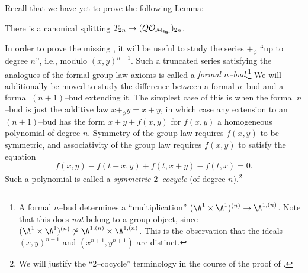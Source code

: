 Recall that we have yet to prove the following Lemma:

\begin{lemma}\label{LazardSplittingLemma}
There is a canonical splitting $T_{2n} \to (Q \mathcal O_{\mathcal{M}_{\mathbf{fgl}}})_{2n}$.
\end{lemma}

\begin{definition}\label{DefinitionSymmetric2Cocycle}
In order to prove the missing , it will be useful to study the series $+_\phi$ ``up to degree $n$'', i.e., modulo $(x, y)^{n+1}$.  Such a truncated series satisfying the analogues of the formal group law axioms is called a \textit{formal $n$--bud}.\footnote{A formal $n$--bud determines a ``multiplication'' $(\A^1 \times \A^1)^{(n)} \to \A^{1,(n)}$.  Note that this does \emph{not} belong to a group object, since $(\A^1 \times \A^1)^{(n)} \not\simeq \A^{1,(n)} \times \A^{1,(n)}$.  This is the observation that the ideals $(x, y)^{n+1}$ and $(x^{n+1}, y^{n+1})$ are distinct.}  We will additionally be moved to study the difference between a formal $n$--bud and a formal $(n+1)$--bud extending it.  The simplest case of this is when the formal $n$--bud is just the additive law $x +_\phi y = x + y$, in which case any extension to an $(n+1)$--bud has the form $x + y + f(x, y)$ for $f(x, y)$ a homogeneous polynomial of degree $n$.  Symmetry of the group law requires $f(x, y)$ to be symmetric, and associativity of the group law requires $f(x, y)$ to satisfy the equation \[f(x, y) - f(t + x, y) + f(t, x + y) - f(t, x) = 0.\]  Such a polynomial is called a \textit{symmetric $2$--cocycle} (of degree $n$).\footnote{We will justify the ``$2$--cocycle'' terminology in the course of the proof of .}
\end{definition}

